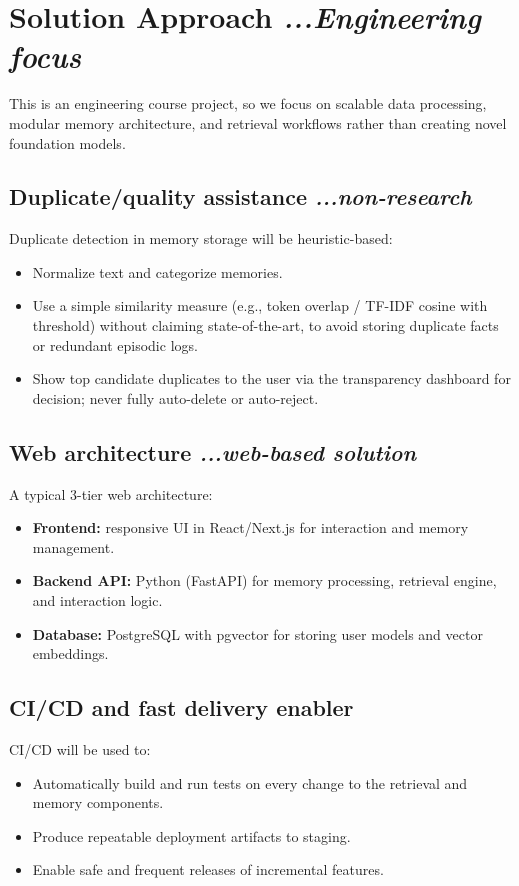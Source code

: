 \documentclass[11pt,a4paper]{article}
\begin{document}
\section[Solution Approach]{Solution Approach \hfill \normalsize\normalfont\textit{...Engineering focus}}
This is an engineering course project, so we focus on scalable data processing, modular memory architecture, and retrieval workflows rather than creating novel foundation models.

\subsection[Duplicate/quality assistance]{Duplicate/quality assistance \hfill \normalsize\normalfont\textit{...non-research}}
Duplicate detection in memory storage will be heuristic-based:
\begin{itemize}
    \item Normalize text and categorize memories.
    \item Use a simple similarity measure (e.g., token overlap / TF-IDF cosine with threshold) without claiming state-of-the-art, to avoid storing duplicate facts or redundant episodic logs.
    \item Show top candidate duplicates to the user via the transparency dashboard for decision; never fully auto-delete or auto-reject.
\end{itemize}

\subsection[Web architecture]{Web architecture \hfill \normalsize\normalfont\textit{...web-based solution}}
A typical 3-tier web architecture:
\begin{itemize}
    \item \textbf{Frontend:} responsive UI in React/Next.js for interaction and memory management.
    \item \textbf{Backend API:} Python (FastAPI) for memory processing, retrieval engine, and interaction logic.
    \item \textbf{Database:} PostgreSQL with pgvector for storing user models and vector embeddings.
\end{itemize}

\subsection{CI/CD and fast delivery enabler}
CI/CD will be used to:
\begin{itemize}
    \item Automatically build and run tests on every change to the retrieval and memory components.
    \item Produce repeatable deployment artifacts to staging.
    \item Enable safe and frequent releases of incremental features.
\end{itemize}
\end{document}
